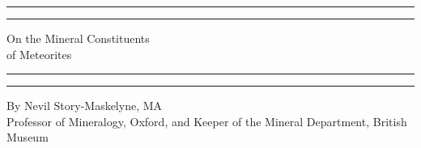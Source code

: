 \documentclass[a4paper, 12pt, oneside]{article}
\begin{document}
\begin{titlepage} %
	\centering %
	\scshape %

	
	\rule{\textwidth}{1.6pt}\vspace*{-\baselineskip}\vspace*{2pt} %
	\rule{\textwidth}{0.4pt} %
	
	\vspace{0.75\baselineskip} %

    {\LARGE On the Mineral Constituents\\ of Meteorites} %
	
	\vspace{0.75\baselineskip} %
	
	\rule{\textwidth}{0.4pt}\vspace*{-\baselineskip}\vspace{3.2pt} %
	\rule{\textwidth}{1.6pt} %
	
	\vspace{1\baselineskip} %
	
	
	{By Nevil Story-Maskelyne, MA\\ \small Professor of Mineralogy, Oxford, and Keeper of the Mineral Department, British Museum} %
	
	\vspace*{1\baselineskip} %
	
	
	\vspace{1\baselineskip} %

	
	
		

\end{titlepage}
\end{document}
